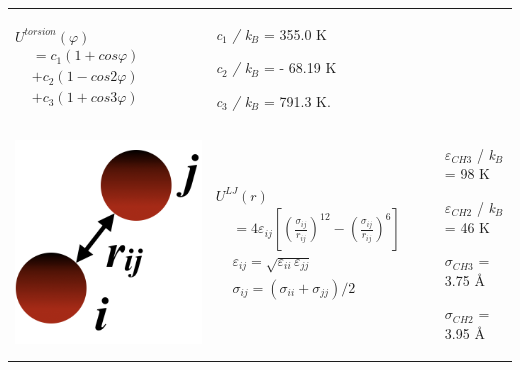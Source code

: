 \documentclass[9pt,bestpractices]{livecoms}
\begin{document}
\begin{table}
\begin{tabularx}{\textwidth}{
p{}
p{}
p{}}
$U^{torsion}\left(\varphi\right)$
$\begin{array}{cc}
 & = c_{1}\left(1+cos\varphi\right)\\
 & + c_{2}\left(1-cos2\varphi\right)\\
 & + c_{3}\left(1+cos3\varphi\right)
\end{array}$
                       & \textit{c}$_{1}$ \textit{/ k}$_{B}$ = 355.0 K \par \textit{c}$_{2}$ \textit{/ k}$_{B}$ = - 68.19 K \par \textit{c}$_{3}$ \textit{/ k}$_{B}$ = 791.3 K. \\
\includegraphics[width=\linewidth]{gfx/image34.png} & \vspace{-20pt} 
$U^{LJ}\left(r\right)$
$\begin{array}{cc}
  &=4\varepsilon_{ij}\left[\left(\frac{\sigma_{ij}}{r_{ij}}\right)^{12}-\left(\frac{\sigma_{ij}}{r_{ij}}\right)^{6}\right] \\
  &\varepsilon_{ij}=\sqrt{\varepsilon_{ii}\,\varepsilon_{jj}} \\
  &\sigma_{ij}=\left(\sigma_{ii}+\sigma_{jj}\right)/2
\end{array}$
                  & ${\varepsilon}$$_{CH3}$ / \textit{k}$_{B}$ = 98 K \par ${\varepsilon}$$_{CH2}$ / \textit{k}$_{B}$ = 46 K \par ${\sigma}$$_{CH3}$ = 3.75 \AA{}  \par ${\sigma}$$_{CH2}$ = 3.95 \AA{} \\
\end{tabularx}
\end{table}
\end{document}

